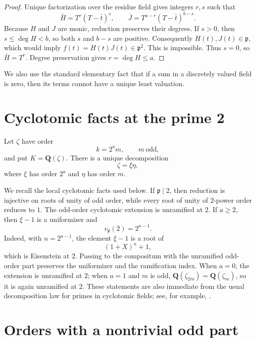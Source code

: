 \documentclass[11pt]{article}
\newcommand{\Q}{\mathbf Q}
\begin{document}
\begin{proof}
Unique factorization over the residue field gives integers $r,s$ such
that
\[
 \bar H=T^r(T-\bar t)^s,
 \qquad
 \bar J=T^{a-r}(T-\bar t)^{b-s}.
\]
Because $H$ and $J$ are monic, reduction preserves their degrees.  If
$s>0$, then $s\leq\deg H<b$, so both $s$ and $b-s$ are positive.
Consequently $H(t),J(t)\in\mathfrak p$, which would imply
$f(t)=H(t)J(t)\in\mathfrak p^2$.  This is impossible.  Thus $s=0$,
so $\bar H=T^r$.  Degree preservation gives $r=\deg H\leq a$.
\end{proof}

We also use the standard elementary fact that if a sum in a discretely
valued field is zero, then its terms cannot have a unique least
valuation.

\section{Cyclotomic facts at the prime 2}

Let $\zeta$ have order
\[
 k=2^a m,
 \qquad m\ \text{odd},
\]
and put $K=\Q(\zeta)$.  There is a unique decomposition
\begin{equation}\label{eq:decomposition}
 \zeta=\xi\eta,
\end{equation}
where $\xi$ has order $2^a$ and $\eta$ has order $m$.

We recall the local cyclotomic facts used below.  If
$\mathfrak p\mid2$, then reduction is injective on roots of unity of odd
order, while every root of unity of $2$-power order reduces to $1$.
The odd-order cyclotomic extension is unramified at $2$.  If $a\geq2$,
then $\xi-1$ is a uniformizer and
\begin{equation}\label{eq:e-value}
 v_{\mathfrak p}(2)=2^{a-1}.
\end{equation}
Indeed, with $n=2^{a-1}$, the element $\xi-1$ is a root of
\[
 (1+X)^n+1,
\]
which is Eisenstein at $2$.  Passing to the compositum with the
unramified odd-order part preserves the uniformizer and the ramification
index.  When $a=0$, the extension is unramified at $2$; when $a=1$ and
$m$ is odd, $\Q(\zeta_{2m})=\Q(\zeta_m)$, so it is again unramified at
$2$.  These statements are also immediate from the usual decomposition
law for primes in cyclotomic fields; see, for example,
\cite[Chapter 2]{Washington1997}.

\section{Orders with a nontrivial odd part}
\end{document}

